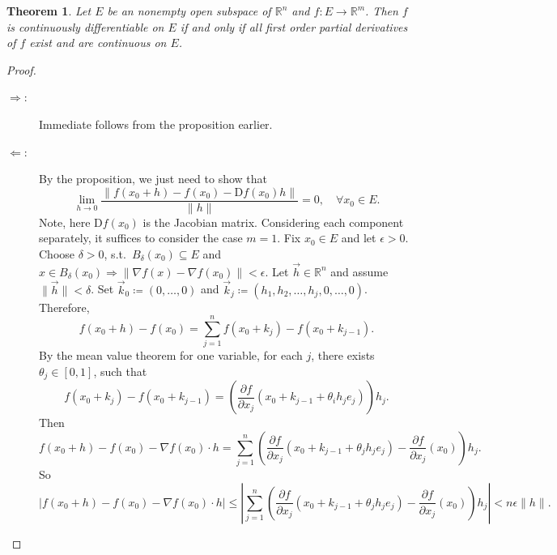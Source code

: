 \documentclass[12pt]{article}
\theoremstyle{plain}
\newtheorem{thm}{Theorem}
\theoremstyle{definition}
\begin{document}
\begin{thm}
    Let $E$ be an nonempty open subspace of $\mathbb{R}^n$ and $f: E\rightarrow\mathbb{R}^m$.
    Then $f$ is continuously differentiable on $E$ if and  only if all first order partial derivatives of $f$ exist and are continuous on $E$.
\end{thm}
\begin{proof}
    \begin{description}
        \item[$\Rightarrow$:]
            Immediate follows from the proposition earlier.
        \item[$\Leftarrow$:]
            By the proposition, we just need to show that
            \[
                \lim_{h\rightarrow 0}\frac{\|f(x_0+h) - f(x_0) - \mathrm{D}f(x_0)h\|}{\|h\|} = 0, \quad \forall x_0\in E.
            \]
            Note, here $\mathrm{D}f(x_0)$ is the Jacobian matrix.
            Considering each component separately, it suffices to consider the case $m=1$.
            Fix $x_0\in E$ and let $\epsilon > 0$.
            Choose $\delta > 0$, s.t.\ $B_\delta(x_0) \subseteq E$ and $x\in B_{\delta}(x_0) \Rightarrow \|\nabla f(x) - \nabla f(x_0)\|<\epsilon$.
            Let $\vec{h}\in\mathbb{R}^n$ and assume $\|\vec{h}\|<\delta$.
            Set $\vec{k}_0\coloneqq (0,\ldots,0)$ and $\vec{k}_j\coloneqq (h_1, h_2, \ldots, h_j, 0, \ldots, 0)$.
            Therefore, 
            \[
                f(x_0+h) - f(x_0) = \sum_{j=1}^n f(x_0 + k_j) - f(x_0 + k_{j-1}).
            \]
            By the mean value theorem for one variable, for each $j$, there exists $\theta_j\in[0,1]$, such that
            \[
                f(x_0 + k_j) - f(x_0 + k_{j-1}) = \left(\frac{\partial f}{\partial x_j} (x_0 + k_{j-1} + \theta_i h_j e_j)\right)h_j.
            \]
            Then
            \[
                f(x_0+h) - f(x_0) - \nabla f(x_0)\cdot h
                =\sum_{j=1}^n \left(\frac{\partial f}{\partial x_j} (x_0+k_{j-1} + \theta_j h_j e_j)  - \frac{\partial f}{\partial
                x_j}(x_0)\right) h_j.
            \]
            So
            \[
                |f(x_0+h) - f(x_0) - \nabla f(x_0)\cdot h|
                \leq \left|\sum_{j=1}^n \left(\frac{\partial f}{\partial x_j} (x_0+k_{j-1} + \theta_j h_j e_j)  - \frac{\partial f}{\partial
                x_j}(x_0)\right) h_j\right| < n \epsilon \|h\|.
            \]
    \end{description}
\end{proof}
\end{document}
